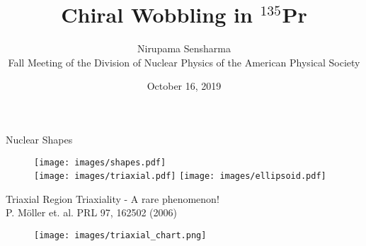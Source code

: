 \documentclass [aspectratio=169]{beamer}
\title{Chiral Wobbling in $^{135}$Pr}
\author{Nirupama Sensharma \\ 
Fall Meeting of the Division of Nuclear Physics of the American Physical Society}
\date{October 16, 2019}
\institute{University of Notre Dame}
\begin{document}
\maketitle

\begin{frame}{Nuclear Shapes}
\centering
\vspace{-8pt}
 \space \space \space \space \space \space \space \space \space \space \space \space \space \space \space \space \space \space \space \space \space \space \space \space \space \space {} \space \space \space \space \space \space \space \space \space \space \space \space \space \space \space \space \space \space \space \space \space \space \space \space \space {}
\begin{figure}
\vspace{-16pt}
\texttt{[image: images/shapes.pdf]}\\
\vspace{-5pt}
\hspace{-27pt}
\texttt{[image: images/triaxial.pdf]}
\hspace{50pt}
\texttt{[image: images/ellipsoid.pdf]}
\end{figure}
\vspace{-84pt}
\hspace{250pt}
\end{frame}

\begin{frame}{Triaxial Region}
\centering
Triaxiality - A rare phenomenon!\\
\scriptsize{\color{violet}P. M\"{o}ller et. al. PRL 97, 162502 (2006)}
\begin{figure}
\texttt{[image: images/triaxial\_chart.png]}
\end{figure}
\end{frame}
\end{document}
